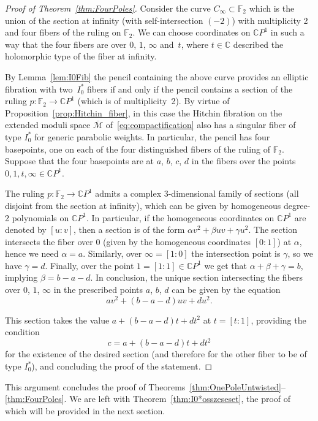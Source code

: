 \documentclass[10pt,a4paper]{amsart}
\newcommand{\C}{{\mathbb C}} %
\newcommand{\CP}[1]{\mathbb{C}P^{#1}} %
\newcommand{\Mod}{{\mathcal M}} %
\numberwithin{equation}{section}
\begin{document}
\begin{proof}[Proof of Theorem~\ref{thm:FourPoles}]
Consider the curve $C_{\infty}\subset {\mathbb {F}}_2$ which is the union
of the section at infinity (with self-intersection $(-2)$) with multiplicity
2 and four fibers of the ruling on ${\mathbb {F}}_2$. We can choose
coordinates on $\CP{1}$ in such a way that the four fibers are
over $0$, $1$, $\infty$ and~$t$, where $t\in \C$ described the holomorphic type
of the fiber at infinity.

By Lemma~\ref{lem:I0Fib} the pencil containing the above curve
provides an elliptic fibration with two~$I_0^*$ fibers if and only if
the pencil contains a section of the ruling $p\colon {\mathbb
 {F}}_2\to \CP{1}$ (which is of multiplicity~2).
 {By virtue of Proposition~\ref{prop:Hitchin_fiber}, in this case
 the Hitchin fibration on the extended moduli space $\overline{\Mod}$
 of~\eqref{eq:compactification} also has a singular fiber of type $I_0^*$
 for generic parabolic weights.}
 In particular, the
pencil has four basepoints, one on each of the four distinguished fibers
of the ruling of ${\mathbb {F}}_2$. Suppose that the four basepoints
are at $a$, $b$, $c$, $d$ in the fibers over the points $0,1,t,\infty \in
\CP{1}$.

The ruling $p\colon {\mathbb {F}}_2\to \CP{1}$ admits a complex
3-dimensional family of sections (all disjoint from the section at
infinity), which can be given by homogeneous degree-2 polynomials on
$\CP{1}$. In particular, if the homogeneous coordinates on $\CP{1}$
are denoted by $[u:v]$, then a section is of the form $\alpha
v^2+\beta uv+\gamma u^2$. The section intersects the fiber over $0$
(given by the homogeneous coordinates $[0:1]$) at $\alpha$,
hence we need $\alpha =a$. Similarly, over $\infty=[1:0]$
the intersection point is $\gamma$, so we have $\gamma =d$.
Finally, over the point $1=[1:1]\in \CP{1}$ we get that
$\alpha +\beta +\gamma =b$, implying $\beta =b-a-d$.
In conclusion, the unique section intersecting the
fibers over $0$, $1$, $\infty$ in the prescribed points $a$, $b$, $d$
can be given by the equation
\[
av^2+(b-a-d)uv+du^2.
\]

This section takes the value
$a+(b-a-d)t+dt^2$ at $t=[t:1]$, providing the condition
\[
c= a+(b-a-d)t+dt^2
\]
for the existence of the desired section (and therefore for the other
fiber to be of type $I_0^*$), and concluding the proof of the statement.
\end{proof}

{This argument concludes the proof of Theorems~\ref{thm:OnePoleUntwisted}--\ref{thm:FourPoles}. We are left
 with Theorem~\ref{thm:I0*osszeseset}, the proof of which will be
 provided in the next section.}
\end{document}
